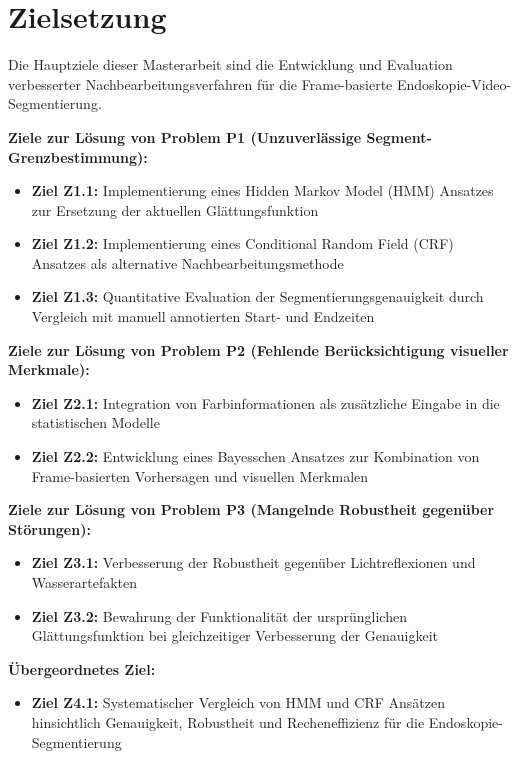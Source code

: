 \section{Zielsetzung}\label{sec:zielsetzung}

Die Hauptziele dieser Masterarbeit sind die Entwicklung und Evaluation verbesserter Nachbearbeitungsverfahren für die Frame-basierte Endoskopie-Video-Segmentierung.

\textbf{Ziele zur Lösung von Problem P1 (Unzuverlässige Segment-Grenzbestimmung):}
\begin{itemize}
\item \textbf{Ziel Z1.1:} Implementierung eines Hidden Markov Model (HMM) Ansatzes zur Ersetzung der aktuellen Glättungsfunktion
\item \textbf{Ziel Z1.2:} Implementierung eines Conditional Random Field (CRF) Ansatzes als alternative Nachbearbeitungsmethode
\item \textbf{Ziel Z1.3:} Quantitative Evaluation der Segmentierungsgenauigkeit durch Vergleich mit manuell annotierten Start- und Endzeiten
\end{itemize}

\textbf{Ziele zur Lösung von Problem P2 (Fehlende Berücksichtigung visueller Merkmale):}
\begin{itemize}
\item \textbf{Ziel Z2.1:} Integration von Farbinformationen als zusätzliche Eingabe in die statistischen Modelle
\item \textbf{Ziel Z2.2:} Entwicklung eines Bayesschen Ansatzes zur Kombination von Frame-basierten Vorhersagen und visuellen Merkmalen
\end{itemize}

\textbf{Ziele zur Lösung von Problem P3 (Mangelnde Robustheit gegenüber Störungen):}
\begin{itemize}
\item \textbf{Ziel Z3.1:} Verbesserung der Robustheit gegenüber Lichtreflexionen und Wasserartefakten
\item \textbf{Ziel Z3.2:} Bewahrung der Funktionalität der ursprünglichen Glättungsfunktion bei gleichzeitiger Verbesserung der Genauigkeit
\end{itemize}

\textbf{Übergeordnetes Ziel:}
\begin{itemize}
\item \textbf{Ziel Z4.1:} Systematischer Vergleich von HMM und CRF Ansätzen hinsichtlich Genauigkeit, Robustheit und Recheneffizienz für die Endoskopie-Segmentierung
\end{itemize}

